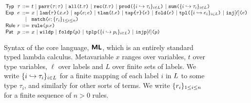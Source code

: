 \documentclass[acmsmall,screen]{acmart}
\begin{document}
\begin{figure}
\begin{minipage}{\textwidth}
\small
$\arraycolsep=2pt\begin{array}{llcl}
\mathsf{Typ} & \tau & ::= & t ~\vert~ \aparr{\tau}{\tau} ~\vert~ \aall{t}{\tau} ~\vert~ \arec{t}{\tau} ~\vert~ \aprod{\labelset}{\mapschema{\tau}{i}{\labelset}} ~\vert~ \asum{\labelset}{\mapschema{\tau}{i}{\labelset}}\\
\mathsf{Exp} & e & ::= & x ~\vert~ \aelam{\tau}{x}{e} ~\vert~ \aeap{e}{e} ~\vert~ \aetlam{t}{e} ~\vert~ \aetap{e}{\tau} ~\vert~ \aefold{e} ~\vert~ \aetpl{\labelset}{\mapschema{e}{i}{\labelset}} ~\vert~  \aein{\ell}{e} \\
& & \vert & \aematchwith{n}{e}{\seqschemaX{r}}\\
\mathsf{Rule} & r & ::= & \aematchrule{p}{e}\\
\mathsf{Pat} & p & ::= & x  ~\vert~ \aewildp ~\vert~ \aefoldp{p} ~\vert~ \aetplp{\labelset}{\mapschema{p}{i}{\labelset}} ~\vert~ \aeinjp{\ell}{p}
\end{array}$
\end{minipage}
\caption[Syntax of the core language of $\miniVersePat$]{Syntax of the core language, $\textsf{\textbf{ML}}$, which is an entirely standard typed lambda calculus.  Metavariable $x$ ranges over variables, $t$ over type variables, $\ell$ over labels and $L$ over finite sets of labels. We write $\{i \hookrightarrow \tau_{i}\}_{i \in L}$ for a finite mapping of each label $i$ in $L$ to some type $\tau_i$, and similarly for other sorts of terms. We write $\{r_{i}\}_{1 \leq i \leq n}$ for a finite sequence of $n > 0$  rules. %
}
\label{fig:U-expanded-terms}
\end{figure}
\end{document}
